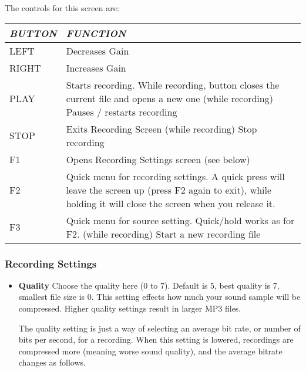 The controls for this screen are:

\begin{tabular}[l]{|p{2.033cm}|p{14.603001cm}|}
\hline
{\centering\bfseries\itshape
BUTTON
\par}
&
{\centering\bfseries\itshape
FUNCTION
\par}
\\\hline
{\centering
LEFT
\par}
&
Decreases Gain
\\\hline
{\centering
RIGHT
\par}
&
Increases Gain
\\\hline
{\centering
PLAY
\par}
&
Starts recording.  While recording, button closes the current file and
opens a new one\newline
(while recording) Pauses / restarts recording
\\\hline
{\centering
STOP
\par}
&
Exits Recording Screen\newline
(while recording) Stop recording
\\\hline
{\centering
F1
\par}
&
Opens Recording Settings screen (see below)
\\\hline
{\centering
F2
\par}
&
Quick menu for recording settings. A quick press will leave the screen
up (press F2 again to exit), while holding it will close the screen
when you release it.
\\\hline
{\centering
F3
\par}
&
Quick menu for source setting. Quick/hold works as for F2.\newline
(while recording) Start a new recording file
\\\hline
\end{tabular}


\subsubsection{\label{ref:Recordingsettings}Recording Settings}
\begin{itemize}
\item \textbf{Quality}
Choose the quality here (0 to 7). Default is 5, best quality is 7,
smallest file size is 0.  This setting effects how much your sound
sample will be compressed.  Higher quality settings result in larger
MP3 files.

The quality setting is just a way of selecting an average bit rate, or
number of  bits per second, for a recording.  When  this setting is
lowered, recordings are compressed more (meaning worse sound quality),
and the average bitrate changes as follows.
\end{itemize}

